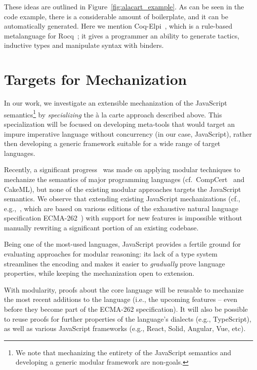 \documentclass[sigplan,nonacm]{acmart}
\begin{document}
These ideas are outlined in Figure~\ref{fig:alacart_example}.
As can be seen in the code example,
there is a considerable amount of boilerplate,
and it can be automatically generated.
Here we mention Coq-Elpi~\cite{tassi2025elpi}, which is a rule-based metalanguage for Rocq~\cite{the_coq_development_team_2024_14542673};
it gives a programmer an ability to generate tactics,
inductive types and manipulate syntax with binders.

\section{Targets for Mechanization}

In our work,
we investigate an extensible mechanization of the JavaScript semantics\footnote{We note that mechanizing the entirety of the JavaScript semantics
and developing a generic modular framework are non-goals.}
by \emph{specializing} the à la carte approach described above.
This specialization will be focused on developing meta-tools that would target an impure imperative language without concurrency (in our case, JavaScript),
rather then developing a generic framework suitable for a wide range of target languages.

Recently, a significant progress~\cite{ebresafe2025certified} was made on applying modular techniques
to mechanize the semantics of major programming languages (cf.~CompCert~\cite{leroy2016compcert} and CakeML\cite{kumar2014cakeml}),
but none of the existing modular approaches targets the JavaScript semantics.
We observe that extending existing JavaScript mechanizations
(cf., e.g.,~\cite{guha2010essence,bodin2014trusted}, which are based on various editions of the exhaustive natural language specification ECMA-262~\cite{ECMA})
with support for new features
is impossible without manually rewriting a significant portion of an existing codebase.

Being one of the most-used languages, JavaScript provides a fertile ground for evaluating approaches for modular reasoning:
its lack of a type system streamlines the encoding and makes it easier to \emph{gradually} prove language properties,
while keeping the mechanization open to extension.


With modularity, proofs about the core language
will be reusable to mechanize the most recent additions to the language
(i.e., the upcoming features -- even before they become part of the ECMA-262 specification).
It will also be possible to reuse proofs for further properties
of the language's dialects (e.g., TypeScript),
as well as various JavaScript frameworks (e.g., React, Solid, Angular, Vue, etc).
\end{document}
